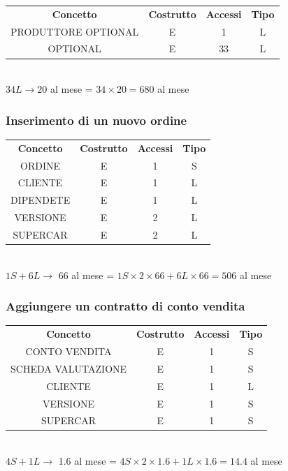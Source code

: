 \documentclass[12pt]{article}
\begin{document}
\begin{table}[H]
    \centering
    \begin{tabular}{ c c c c } 
        \rowcolor{red!20!}
        \textbf{Concetto} & \textbf{Costrutto} & \textbf{Accessi} &
        \textbf{Tipo}\\ 
        PRODUTTORE OPTIONAL & E & 1 & L \\ 
        OPTIONAL & E & 33 & L \\ 
    \end{tabular}\\
    \( 34L \rightarrow 20\) al mese = \( 34 \times 20 = 680 \) al mese
\end{table}

\subsubsection{Inserimento di un nuovo ordine} \label{Inserimento di un nuovo
ordine}

\begin{table}[H]
    \centering
    \begin{tabular}{ c c c c } 
        \rowcolor{red!20!}
        \textbf{Concetto} & \textbf{Costrutto} & \textbf{Accessi} &
        \textbf{Tipo}\\ 
        ORDINE & E & 1 & S \\ 
        CLIENTE & E & 1 & L \\ 
        DIPENDETE & E & 1 & L \\ 
        VERSIONE & E & 2 & L \\
        SUPERCAR & E & 2 & L \\ 
    \end{tabular}\\
    \( 1S + 6L \rightarrow \) 66 al mese = \( 1S \times 2 \times 66 + 6L \times
    66 = 506 \) al mese
\end{table}

\subsubsection{Aggiungere un contratto di conto vendita} \label{Aggiungere un
contratto di conto vendita}

\begin{table}[H]
    \centering
    \begin{tabular}{ c c c c } 
        \rowcolor{red!20!}
        \textbf{Concetto} & \textbf{Costrutto} & \textbf{Accessi} &
        \textbf{Tipo}\\ 
        CONTO VENDITA & E & 1 & S \\ 
        SCHEDA VALUTAZIONE & E & 1 & S \\ 
        CLIENTE & E & 1 & L \\ 
        VERSIONE & E & 1 & S \\ 
        SUPERCAR & E & 1 & S \\ 
    \end{tabular}\\
    \(4S + 1L \rightarrow \) 1.6 al mese = \( 4S \times 2 \times 1.6 + 1L \times
    1.6 = 14.4 \) al mese  
\end{table}
\end{document}
